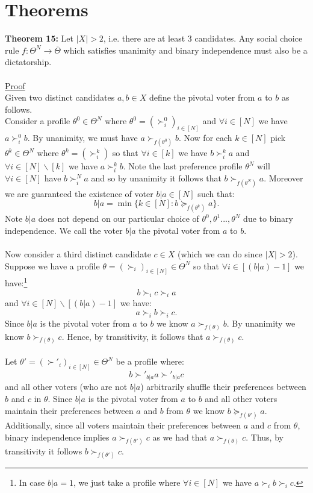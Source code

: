 \documentclass[11pt]{article}
\theoremstyle{definition}
\theoremstyle{plain}
\begin{document}
\section{Theorems}
\noindent\textbf{Theorem 15:} Let $|X|>2$, i.e. there are at least $3$ candidates. Any social choice rule $f: \Theta^N \to \overline{\Theta}$ which satisfies unanimity and binary independence must also be a dictatorship.
\\
\\
\underline{Proof}
\\
Given two distinct candidates $a,b \in X$ define the pivotal voter from $a$ to $b$ as follows. 
\\
Consider a  profile $\theta^0 \in \Theta^N$ where $\theta^0=(\succ^0_i)_{i \in [N]}$ and $\forall i \in [N]$ we have $a \succ^0_i b$. By unanimity, we must have $a \succ_{f(\theta^0)} b$. Now for each $k \in [N]$ pick $\theta^k \in \Theta^N$ where $\theta^k=(\succ^k_i)$ so that $\forall i \in [k]$ we have $b \succ^k_i a$ and $\forall i \in [N] \backslash [k]$ we have $a \succ^k_i b$. Note the last preference profile $\theta^N$ will $\forall i \in [N]$ have $b \succ^N_i a$ and so by unanimity it follows that $b \succ_{f(\theta^N)} a$. Moreover we are guaranteed the existence of voter $b|a \in [N]$ such that:
$$b|a=\min \{ k \in [N] : b \succeq_{f(\theta^k)} a\}.$$
Note $b|a$ does not depend on our particular choice of $\theta^0,\theta^1...,\theta^N$ due to binary independence. We call the voter $b|a$ the pivotal voter from $a$ to $b$.
\\
\\
\noindent Now consider a third distinct candidate $c \in X$ (which we can do since $|X|>2$). Suppose we have a  profile $\theta=(\succ_i)_{i \in [N]} \in \Theta^N$ so that $\forall i \in [(b|a)-1]$ we have:\footnote{In case $b|a=1$,  we just take a profile where $\forall i \in [N]$ we have $a \succ_i b \succ_i c$.}
$$b \succ_i c \succ_i a$$
and $\forall i \in [N] \backslash[(b|a)-1]$ we have:
$$ a \succ_{i} b \succ_{i} c.$$  
Since $b|a$ is the pivotal voter from $a$ to $b$ we know $a \succ_{f(\theta)} b$. By unanimity we know $b \succ_{f(\theta)} c$. Hence, by transitivity, it follows that $a \succ_{f(\theta)} c$. 
\\
\\
Let $\theta'=(\succ'_i)_{i \in [N]} \in \Theta^N$ be a profile where:
$$b \succ'_{b|a} a \succ'_{b|a} c$$
and all other voters (who are not $b|a$) arbitrarily shuffle their preferences between $b$ and $c$ in $\theta$. Since $b|a$ is the pivotal voter from $a$ to $b$ and all other voters maintain their preferences between $a$ and $b$ from $\theta$ we know $b \succeq_{f(\theta')} a$. Additionally, since all voters maintain their preferences between $a$ and $c$ from $\theta$, binary independence implies $a \succ_{f(\theta')} c$ as we had that $a \succ_{f(\theta)} c$.  Thus, by transitivity it follows  $b \succ_{f(\theta')} c$. 
\end{document}
